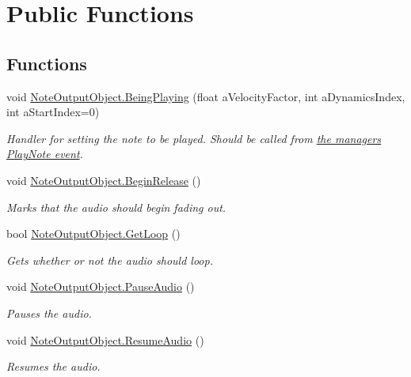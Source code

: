 \hypertarget{group___n_o_o_pub_func}{}\section{Public Functions}
\label{group___n_o_o_pub_func}
\subsection*{Functions}
\begin{DoxyCompactItemize}
\item 
void \hyperlink{group___n_o_o_pub_func_ga2bdaa2787408f353f71ef6c6a18e9285}{Note\+Output\+Object.\+Being\+Playing} (float a\+Velocity\+Factor, int a\+Dynamics\+Index, int a\+Start\+Index=0)
\begin{DoxyCompactList}\small\item\em Handler for setting the note to be played. Should be called from \hyperlink{group___v_i_m_event_types_class_virtual_instrument_manager_1_1_play_note_event}{the manager\textquotesingle{}s Play\+Note event}. \end{DoxyCompactList}\item 
void \hyperlink{group___n_o_o_pub_func_ga044e62759958d717c7fa4fd1615e2ec1}{Note\+Output\+Object.\+Begin\+Release} ()
\begin{DoxyCompactList}\small\item\em Marks that the audio should begin fading out. \end{DoxyCompactList}\item 
bool \hyperlink{group___n_o_o_pub_func_ga24d76043802c442f571c5c34a854ff86}{Note\+Output\+Object.\+Get\+Loop} ()
\begin{DoxyCompactList}\small\item\em Gets whether or not the audio should loop. \end{DoxyCompactList}\item 
void \hyperlink{group___n_o_o_pub_func_ga7977bc941f355866c7e4c141a8f7b8bb}{Note\+Output\+Object.\+Pause\+Audio} ()
\begin{DoxyCompactList}\small\item\em Pauses the audio. \end{DoxyCompactList}\item 
void \hyperlink{group___n_o_o_pub_func_ga2df8edec357dd4123146c9a7e8485ffb}{Note\+Output\+Object.\+Resume\+Audio} ()
\begin{DoxyCompactList}\small\item\em Resumes the audio. \end{DoxyCompactList}\item 

\end{DoxyCompactItemize}
